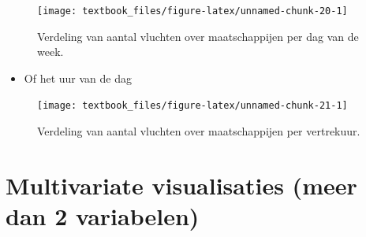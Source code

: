 \documentclass[]{tufte-book}
\providecommand{\tightlist}{%
  \setlength{\itemsep}{0pt}\setlength{\parskip}{0pt}}
\begin{document}
\begin{figure}
\texttt{[image: textbook\_files/figure-latex/unnamed-chunk-20-1]} \caption[Verdeling van aantal vluchten over maatschappijen per dag van de week]{Verdeling van aantal vluchten over maatschappijen per dag van de week.}\label{fig:unnamed-chunk-20}
\end{figure}

\begin{itemize}
\tightlist
\item
  Of het uur van de dag
\end{itemize}

\begin{figure}
\texttt{[image: textbook\_files/figure-latex/unnamed-chunk-21-1]} \caption[Verdeling van aantal vluchten over maatschappijen per vertrekuur]{Verdeling van aantal vluchten over maatschappijen per vertrekuur.}\label{fig:unnamed-chunk-21}
\end{figure}

\hypertarget{multivariate-visualisaties-meer-dan-2-variabelen}{%
\section{Multivariate visualisaties (meer dan 2 variabelen)}\label{multivariate-visualisaties-meer-dan-2-variabelen}}
\end{document}
